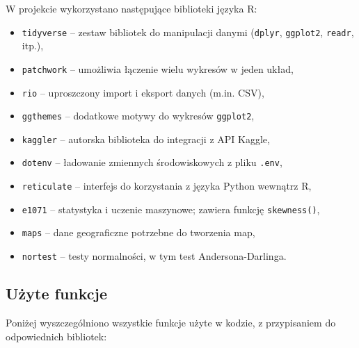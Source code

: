\documentclass[polish]{article}
\begin{document}
    W projekcie wykorzystano następujące biblioteki języka R:

    \begin{itemize}
        \item \texttt{tidyverse} -- zestaw bibliotek do manipulacji danymi (\texttt{dplyr}, \texttt{ggplot2}, \texttt{readr}, itp.),
        \item \texttt{patchwork} -- umożliwia łączenie wielu wykresów w jeden układ,
        \item \texttt{rio} -- uproszczony import i eksport danych (m.in. CSV),
        \item \texttt{ggthemes} -- dodatkowe motywy do wykresów \texttt{ggplot2},
        \item \texttt{kaggler} -- autorska biblioteka do integracji z API Kaggle,
        \item \texttt{dotenv} -- ładowanie zmiennych środowiskowych z pliku \texttt{.env},
        \item \texttt{reticulate} -- interfejs do korzystania z języka Python wewnątrz R,
        \item \texttt{e1071} -- statystyka i uczenie maszynowe; zawiera funkcję \texttt{skewness()},
        \item \texttt{maps} -- dane geograficzne potrzebne do tworzenia map,
        \item \texttt{nortest} -- testy normalności, w tym test Andersona-Darlinga.
    \end{itemize}

    \subsection{Użyte funkcje}

    Poniżej wyszczególniono wszystkie funkcje użyte w kodzie, z przypisaniem do odpowiednich bibliotek:
\end{document}
